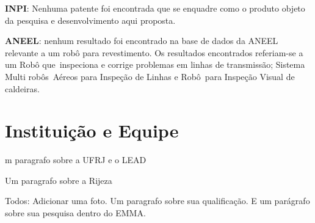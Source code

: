 \textbf{INPI}: Nenhuma patente foi encontrada que se enquadre como o produto
objeto da pesquisa e desenvolvimento aqui proposta.

\textbf{ANEEL}: nenhum resultado foi encontrado na base de dados da ANEEL
relevante a um robô para revestimento. Os resultados encontrados referiam-se a
um Robô que inspeciona e corrige problemas em linhas de transmissão; Sistema
Multi robôs Aéreos para Inspeção de Linhas e Robô para Inspeção Visual de
caldeiras.

\section{Instituição e Equipe}

m paragrafo sobre a UFRJ e o LEAD 

Um paragrafo sobre a Rijeza 

Todos: Adicionar uma foto. Um paragrafo sobre sua qualificação. E um parágrafo
sobre sua pesquisa dentro do EMMA.

